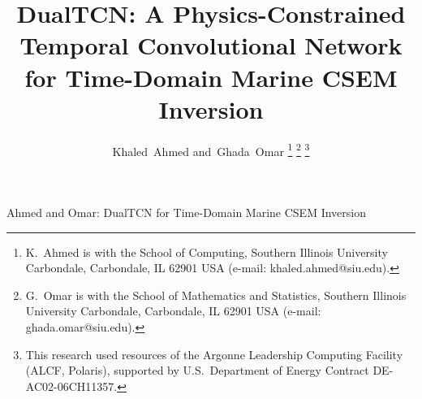 \documentclass[journal]{IEEEtran}
\begin{document}
\title{DualTCN: A Physics-Constrained Temporal Convolutional Network
for Time-Domain Marine CSEM Inversion}

\author{Khaled~Ahmed
  and~Ghada~Omar%
  \thanks{K.\ Ahmed is with the School of Computing,
    Southern Illinois University Carbondale, Carbondale, IL 62901 USA
    (e-mail: khaled.ahmed@siu.edu).}%
  \thanks{G.\ Omar is with the School of Mathematics and Statistics,
    Southern Illinois University Carbondale, Carbondale, IL 62901 USA
    (e-mail: ghada.omar@siu.edu).}%
  \thanks{This research used resources of the Argonne Leadership
    Computing Facility (ALCF, Polaris), supported by U.S.\ Department
    of Energy Contract DE-AC02-06CH11357.}%
}

%
{Ahmed and Omar: DualTCN for Time-Domain Marine CSEM Inversion}

\maketitle
\end{document}
